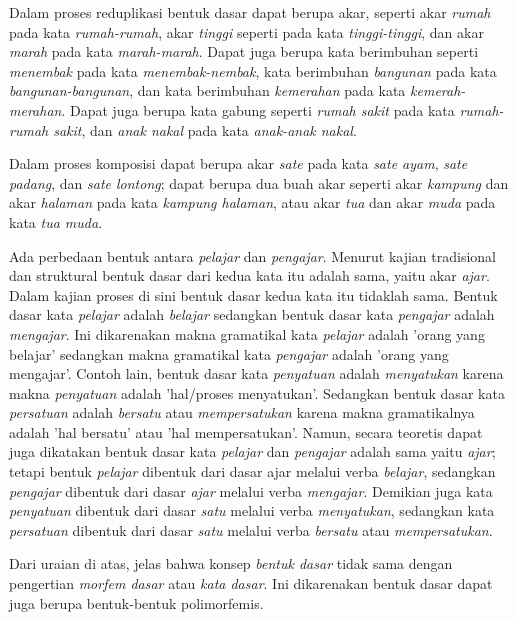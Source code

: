 Dalam proses reduplikasi bentuk dasar dapat berupa akar, seperti akar \textit{rumah} pada kata \textit{rumah-rumah}, akar \textit{tinggi} seperti pada kata \textit{tinggi-tinggi}, dan akar \textit{marah} pada kata \textit{marah-marah}. Dapat juga berupa kata berimbuhan seperti \textit{menembak} pada kata \textit{menembak-nembak}, kata berimbuhan \textit{bangunan} pada kata \textit{bangunan-bangunan}, dan kata berimbuhan \textit{kemerahan} pada kata \textit{kemerah-merahan}. Dapat juga berupa kata gabung seperti \textit{rumah sakit} pada kata \textit{rumah-rumah sakit}, dan \textit{anak nakal} pada kata \textit{anak-anak nakal}.

Dalam proses komposisi dapat berupa akar \textit{sate} pada kata \textit{sate ayam}, \textit{sate padang}, dan \textit{sate lontong}; dapat berupa dua buah akar seperti akar \textit{kampung} dan akar \textit{halaman} pada kata \textit{kampung halaman}, atau akar \textit{tua} dan akar \textit{muda} pada kata \textit{tua muda}.

Ada perbedaan bentuk antara \textit{pelajar} dan \textit{pengajar}. Menurut kajian tradisional dan struktural bentuk dasar dari kedua kata itu adalah sama, yaitu akar \textit{ajar}. Dalam kajian proses di sini bentuk dasar kedua kata itu tidaklah sama. Bentuk dasar kata \textit{pelajar} adalah \textit{belajar} sedangkan bentuk dasar kata \textit{pengajar} adalah \textit{mengajar}. Ini dikarenakan makna gramatikal kata \textit{pelajar} adalah 'orang yang belajar' sedangkan makna gramatikal kata \textit{pengajar} adalah 'orang yang mengajar'. Contoh lain, bentuk dasar kata \textit{penyatuan} adalah \textit{menyatukan} karena makna \textit{penyatuan} adalah 'hal/proses menyatukan'. Sedangkan bentuk dasar kata \textit{persatuan} adalah \textit{bersatu} atau \textit{mempersatukan} karena makna gramatikalnya adalah 'hal bersatu' atau 'hal mempersatukan'. Namun, secara teoretis dapat juga dikatakan bentuk dasar kata \textit{pelajar} dan \textit{pengajar} adalah sama yaitu \textit{ajar}; tetapi bentuk \textit{pelajar} dibentuk dari dasar ajar melalui verba \textit{belajar}, sedangkan \textit{pengajar} dibentuk dari dasar \textit{ajar} melalui verba \textit{mengajar}. Demikian juga kata \textit{penyatuan} dibentuk dari dasar \textit{satu} melalui verba \textit{menyatukan}, sedangkan kata \textit{persatuan} dibentuk dari dasar \textit{satu} melalui verba \textit{bersatu} atau \textit{mempersatukan}.

Dari uraian di atas, jelas bahwa konsep \textit{bentuk dasar} tidak sama dengan pengertian \textit{morfem dasar} atau \textit{kata dasar}. Ini dikarenakan bentuk dasar dapat juga berupa bentuk-bentuk polimorfemis.


